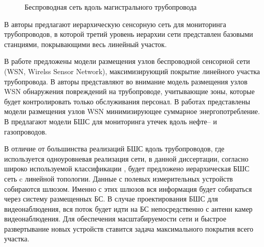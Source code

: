 \begin{figure}[ht]
  \caption{Беспроводная сеть вдоль магистрального трубопровода}\label{fig:part2_pipeline}
\end{figure}

В \cite{Anupama2014, Jawhar2007} авторы предлагают иерархическую сенсорную сеть для мониторинга трубопроводов, в которой третий уровень иерархии сети представлен базовыми станциями, покрывающими весь линейный участок.

В работе \cite{Alduraibi2016} предложены модели размещения узлов беспроводной сенсорной сети (WSN, Wirelss Sensor Network), максимизирующий покрытие линейного участка трубопровода. В \cite{Aria2020} авторы представляют во внимание модель размещения узлов WSN обнаружения повреждений на трубопроводе, учитывающие зоны, которые будет контролировать только обслуживания персонал. В работах \cite{Hussein2020, Varshney2018, Varshney2021} представлены модели размещения узлов WSN минимизирующее суммарное энергопотребление.  В \cite{Albaseer2019} предлагают модели БШС для мониторинга утечек вдоль нефте-- и газопроводов.

В отличие от большинства реализаций БШС вдоль трубопроводов, где используется одноуровневая реализация сети, в данной диссертации, согласно широко используемой классификации \cite{Jawhar2009, Varshney2015, Abbas2018, Wang2011, Jawhar2013}, будет предложено иерархическая БШС сеть c линейной топологии. Данные с полевых измерительных устройств собираются шлюзом. Именно с этих шлюзов вся информация будет собираться через систему размещенных БС. В случае проектирования БШС для видеонаблюдения, вся поток будет идти на БС непосредственно с антенн камер видеонаблюдения. Для обеспечения масштабируемости сети и быстрое развертывание новых устройств ставится задача максимального покрытия всего участка.

